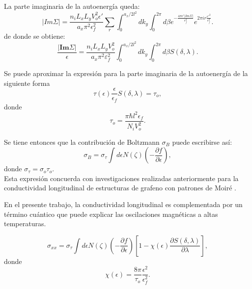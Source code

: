 \begin{frame}
  La parte imaginaria de la autoenergía queda:
  \begin{equation}
    \mid Im\Sigma\mid=\frac{n_{i}L_{x}L_{y}V_{o}^{2}\epsilon'}{a_{x}\pi^{2} \epsilon_{f}^{2}}\sum_{r}\int_{0}^{a_{x}/2l^{2}}dk_{y} \int_{0}^{2\pi}d\beta e^{-\frac{4\pi\epsilon'|Im \Sigma|}{\epsilon_{f}^{2}}}e^{2\pi ir\frac{\epsilon'^{2}}{\epsilon_{f}^{2}}}.
    \label{|ImE|}
  \end{equation}
  de donde se obtiene:
  \begin{equation}
    \frac{\left|\textbf{Im}\Sigma\right|}{\epsilon}=\frac{n_{i}L_{x}L_{y}V_{o}^{2}}{a_{x}\pi^{2} \varepsilon_{f}^{2}}\int_{0}^{a_{x}/2l^{2}}dk_{y} \int_{0}^{2\pi}d\beta S(\delta,\lambda).
    \label{Im/e}
  \end{equation}
\end{frame}

\begin{frame}
  Se puede aproximar la expresión para la parte imaginaria de la autoenergía de la siguiente forma
  \begin{equation}
    \tau(\epsilon)\frac{\epsilon}{\epsilon_{f}}S(\delta,\lambda)=\tau_{o},
    \label{tau}
   \end{equation}
  donde
   \begin{equation}
    \tau_{o}=\frac{\pi\hbar l^{2}\epsilon_{f}}{N_{i}V_{o}^{2}}.
    \label{tau_0}
   \end{equation}
\end{frame}

\begin{frame}
  Se tiene entonces que la contribución de Boltzmann $\sigma_B$ puede escribirse así:
  \begin{equation}
    \sigma_{B}=\sigma_{\tau}\int d\epsilon N(\zeta)\left(-\frac{\partial f}{\partial\epsilon}\right),
  \end{equation}
  donde $ \sigma_{\tau} = \sigma_{o} \tau_{o} $.\\
  \vspace{0.5cm}
  Esta expresión concuerda con investigaciones realizadas
  anteriormente para la conductividad longitudinal de estructuras de grafeno con patrones de Moiré \cite{Kumar2017}.
\end{frame}

\begin{frame}

  En el presente trabajo, la conductividad longitudinal es complementada por un
  término cuántico que puede explicar las oscilaciones magnéticas a altas temperaturas.

  \begin{equation}
      \sigma_{xx} = \sigma_{\tau} \int d\epsilon N(\zeta) \left(-\frac{\partial f}{\partial\epsilon}\right) \left[ 1 - \chi(\epsilon) \frac{\partial S(\delta,\lambda)}{\partial \lambda} \right],
      \label{sigma_xx}
  \end{equation}
  donde
  \begin{equation}
      \chi(\epsilon) =  \frac{8\pi}{\tau_o}\frac{\epsilon^2}{\epsilon_{f}^{2}}.
  \end{equation}
\end{frame}
